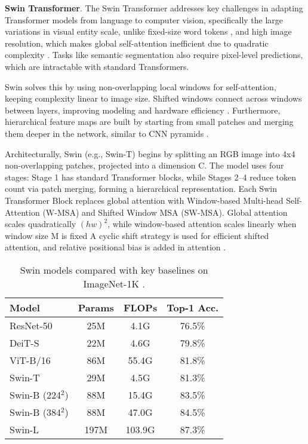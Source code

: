 \documentclass[conference]{IEEEtran}
\begin{document}
\textbf{Swin Transformer}. \hspace{0.5em}The Swin Transformer addresses key challenges in adapting Transformer models from language to computer vision, specifically the large variations in visual entity scale, unlike fixed-size word tokens \cite{lin2017feature,singh2018analysis,singh2018sniper}, and high image resolution, which makes global self-attention inefficient due to quadratic complexity \cite{vaswani2017attention,dosovitskiy2021an}. Tasks like semantic segmentation also require pixel-level predictions, which are intractable with standard Transformers.

Swin solves this by using non-overlapping local windows for self-attention, keeping complexity linear to image size. Shifted windows connect across windows between layers, improving modeling and hardware efficiency \cite{hu2019local,ramachandran2019stand}. Furthermore, hierarchical feature maps are built by starting from small patches and merging them deeper in the network, similar to CNN pyramids \cite{lin2017feature,ronneberger2015u}.

Architecturally, Swin (e.g., Swin-T) begins by splitting an RGB image into 4x4 non-overlapping patches, projected into a dimension C. The model uses four stages: Stage 1 has standard Transformer blocks, while Stages 2–4 reduce token count via patch merging, forming a hierarchical representation. Each Swin Transformer Block replaces global attention with Window-based Multi-head Self-Attention (W-MSA) and Shifted Window MSA (SW-MSA). Global attention scales quadratically $(hw)^2$, while window-based attention scales linearly when window size M is fixed  A cyclic shift strategy is used for efficient shifted attention, and relative positional bias is added in attention \cite{bello2020attention}.




 \begin{table}[ht]
\caption{Swin models compared with key baselines on ImageNet-1K .}
\label{tab:swin_compact}
\centering
\begin{tabular}{lccc}
\toprule
\textbf{Model} & \textbf{Params} & \textbf{FLOPs} & \textbf{Top-1 Acc.} \\
\midrule
ResNet-50 & 25M & 4.1G & 76.5\% \\
DeiT-S & 22M & 4.6G & 79.8\% \\
ViT-B/16 & 86M & 55.4G & 81.8\% \\
Swin-T & 29M & 4.5G & 81.3\% \\
Swin-B (224$^2$) & 88M & 15.4G & 83.5\% \\
Swin-B (384$^2$) & 88M & 47.0G & 84.5\% \\
Swin-L & 197M & 103.9G & 87.3\% \\
\bottomrule
\end{tabular}
\end{table}
\end{document}
